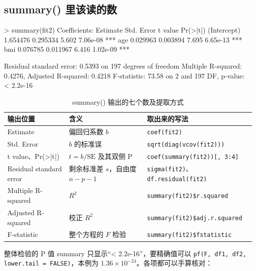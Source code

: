 \subsection{summary() 里该读的数}
\begin{ROut}
> summary(fit2)
Coefficients:
            Estimate Std. Error t value Pr(>|t|)
(Intercept) 1.654476   0.295334   5.602 7.06e-08 ***
age         0.029963   0.003894   7.695 6.65e-13 ***
bmi         0.076785   0.011967   6.416 1.02e-09 ***

Residual standard error: 0.5393 on 197 degrees of freedom
Multiple R-squared:  0.4276,	Adjusted R-squared:  0.4218
F-statistic: 73.58 on 2 and 197 DF,  p-value: < 2.2e-16
\end{ROut}

\begin{table}[htbp]
\centering\small
\caption{summary() 输出的七个数及提取方式}
\begin{tabular}{@{}lll@{}}
\toprule
输出位置 & 含义 & 取出来的写法\\
\midrule
Estimate & 偏回归系数 $b$ & \Verb|coef(fit2)|\\
Std. Error & $b$ 的标准误 & \Verb|sqrt(diag(vcov(fit2)))|\\
t value、Pr(>|t|) & $t=b/\mathrm{SE}$ 及其双侧 P & \Verb|coef(summary(fit2))[, 3:4]|\\
Residual standard error & 剩余标准差 $s$，自由度 $n-p-1$ & \Verb|sigma(fit2)|、\Verb|df.residual(fit2)|\\
Multiple R-squared & $R^2$ & \Verb|summary(fit2)$r.squared|\\
Adjusted R-squared & 校正 $R^2$ & \Verb|summary(fit2)$adj.r.squared|\\
F-statistic & 整个方程的 $F$ 检验 & \Verb|summary(fit2)$fstatistic|\\
\bottomrule
\end{tabular}
\end{table}

整体检验的 P 值 summary 只显示“< 2.2e-16”，要精确值可以 \Verb|pf(F, df1, df2, lower.tail = FALSE)|，本例为 $1.36\times10^{-24}$。各项都可以手算核对：


